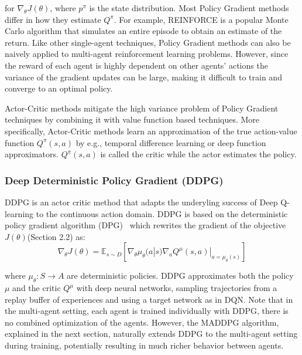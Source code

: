 for $\nabla_{\theta} J(\theta)$, where $p^\pi$ is the state distribution. Most Policy Gradient methods differ in how they estimate $Q^{\pi}$. For example, REINFORCE is a popular Monte Carlo algorithm that simulates an entire episode to obtain an estimate of the return. Like other single-agent techniques, Policy Gradient methods can also be naively applied to multi-agent reinforcement learning problems. However, since the reward of each agent is highly dependent on other agents’ actions the variance of the gradient updates can be large, making it difficult to train and converge to an optimal policy.

Actor-Critic methods mitigate the high variance problem of Policy Gradient techniques by combining it with value function based techniques. More specifically, Actor-Critic methods learn an approximation of the true action-value function $Q^{\pi} (s, a)$ by e.g., temporal difference learning or deep function approximators. $Q^{\pi} (s, a)$ is called the critic while the actor estimates the policy.

\subsubsection{Deep Deterministic Policy Gradient (DDPG)}
DDPG is an actor critic method that adapts the underyling success of Deep Q-learning to the continuous action domain. DDPG is based on the deterministic  policy gradient algorithm (DPG)~\cite{silver2014deterministic} which rewrites the gradient of the objective $J(\theta)$(Section 2.2) as:
\begin{equation}
	\nabla_{\theta}J(\theta) = \mathbb{E}_{s \sim D} [\nabla_{\theta}\mu_{\theta}(a|s)\nabla_{a} Q^{\mu}(s,a)|_{a = \mu_{\theta}(s)}]
\end{equation}

where $\mu_{\theta}: S \rightarrow A$ are deterministic policies. DDPG approximates both the policy $\mu$ and the critic $Q^{\mu}$ with deep neural networks, sampling trajectories from a replay buffer of experiences and using a target network as in DQN. Note that in the multi-agent setting, each agent is trained individually with DDPG, there is no combined optimization of the agents. However, the MADDPG algorithm, explained in the next section, naturally extends DDPG to the multi-agent setting during training, potentially resulting in much richer behavior between agents.

